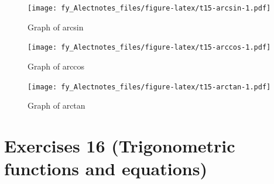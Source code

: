 \documentclass[
  12pt,
  oneside]{book}
\theoremstyle{definition}
\theoremstyle{definition}
\theoremstyle{definition}
\theoremstyle{definition}
\theoremstyle{remark}
\begin{document}
\begin{figure}
\centering
\texttt{[image: fy\_Alectnotes\_files/figure-latex/t15-arcsin-1.pdf]}
\caption{\label{fig:t15-arcsin}Graph of arcsin}
\end{figure}

\begin{figure}
\centering
\texttt{[image: fy\_Alectnotes\_files/figure-latex/t15-arccos-1.pdf]}
\caption{\label{fig:t15-arccos}Graph of arccos}
\end{figure}

\begin{figure}
\centering
\texttt{[image: fy\_Alectnotes\_files/figure-latex/t15-arctan-1.pdf]}
\caption{\label{fig:t15-arctan}Graph of arctan}
\end{figure}

\chapter*{Exercises 16 (Trigonometric functions and equations)}\label{exercises-16-trigonometric-functions-and-equations}
\end{document}

